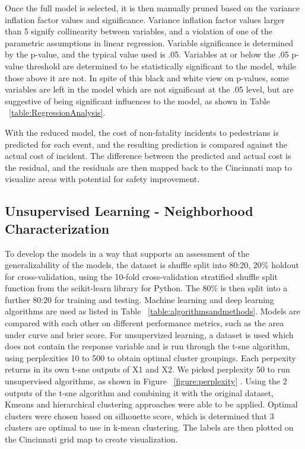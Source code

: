 \documentclass{llncs}
\begin{document}
Once the full model is selected, it is then manually pruned based on the variance inflation factor values and significance. Variance inflation factor values larger than 5 signify collinearity between variables, and a violation of one of the parametric assumptions in linear regression. Variable significance is determined by the p-value, and the typical value used is .05. Variables at or below the .05 p-value threshold are determined to be statistically significant to the model, while those above it are not. In spite of this black and white view on p-values, some variables are left in the model which are not significant at the .05 level, but are suggestive of being significant influences to the model, as shown in Table ~\ref{table:RegressionAnalysis}. 

With the reduced model, the cost of non-fatality incidents to pedestrians is predicted for each event, and the resulting prediction is compared against the actual cost of incident. The difference between the predicted and actual cost is the residual, and the residuals are then mapped back to the Cincinnati map to visualize areas with potential for safety improvement.

\subsection{Unsupervised Learning - Neighborhood Characterization}

To develop the models in a way that supports an assessment of the generalizability of the models,  the dataset is shuffle split into 80:20, 20\% holdout for cross-validation, using the 10-fold cross-validation stratified shuffle split function from the scikit-learn library for Python. The 80\% is then split into a further 80:20 for training and testing. Machine learning and deep learning algorithms are used as listed in Table ~\ref{table:algorithmsandmethods}. Models are compared with each other on different performance metrics, such as the area under curve and brier score.
%
For unsupervized learning, a dataset is used which does not contain the response variable and is run through the t-sne algorithm, using perplexities 10 to 500 to obtain optimal cluster groupings. Each perpexity returns in its own t-sne outputs of X1 and X2. We picked perplexity 50 to run unsupervised algorithms, as shown in Figure ~\ref{figure:perplexity} . Using the 2 outputs of the t-sne algorithm and combining it with the original dataset, Kmeans and hierarchical clustering approaches were able to be applied.  Optimal clusters were chosen based on silhouette score, which is determined that 3 clusters are optimal to use in k-mean clustering.  The labels are then plotted on the Cincinnati grid map to create visualization. 
\end{document}
